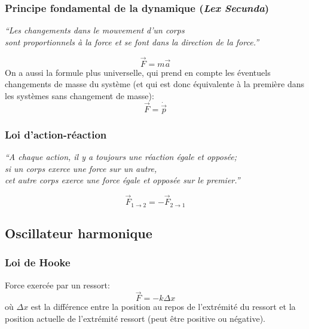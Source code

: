 \documentclass{article}
\begin{document}
\subsubsection{Principe fondamental de la dynamique (\textit{Lex Secunda})}
\begin{center}
	\emph{``Les changements dans le mouvement d'un corps \\ sont proportionnels à la force et se font dans la direction de la force.''}
\end{center}
\begin{equation} \label{eq:lexsecunda}
	\boxed{\vec F = m \vec a}
\end{equation}
On a aussi la formule plus universelle, qui prend en compte les éventuels changements de masse du système (et qui est donc équivalente à la première dans les systèmes sans changement de masse):
\begin{equation} \label{eq:lexsecundap}
	\vec F = \dot{\vec p}
\end{equation}

\subsubsection{Loi d'action-réaction}
\begin{center}
	\emph{``A chaque action, il y a toujours une réaction égale et opposée;\\
	si un corps exerce une force sur un autre,\\
	cet autre corps exerce une force égale et opposée sur le premier.''}
\end{center}
\begin{equation}
	\boxed{\vec F_{1 \to 2} = - \vec F_{2 \to 1}}
\end{equation}

\subsection{Oscillateur harmonique}
\subsubsection{Loi de Hooke}
Force exercée par un ressort:
\begin{equation}
	\boxed{\vec F = -k \Delta x}
\end{equation}
où $\Delta x$ est la différence entre la position au repos de l'extrémité du ressort et la position actuelle de l'extrémité ressort (peut être positive ou négative).
\end{document}
